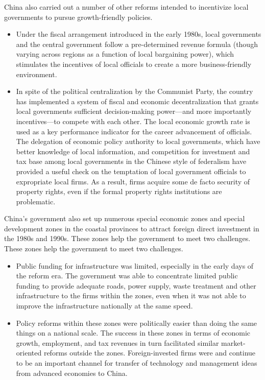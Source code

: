 \documentclass{article}
\begin{document}
    China also carried out a number of other reforms intended to incentivize local governments to pursue growth-friendly policies.
    \begin{itemize}
        \item Under the fiscal arrangement introduced in the early 1980s, local governments and the central government follow a pre-determined revenue formula (though varying across regions as a function of local bargaining power), which stimulates the incentives of local officials to create a more business-friendly environment.
        \item In spite of the political centralization by the Communist Party, the country has implemented a system of fiscal and economic decentralization that grants local governments sufficient decision-making power—and more importantly incentives—to compete with each other. The local economic growth rate is used as a key performance indicator for the career advancement of officials. The delegation of economic policy authority to local governments, which have better knowledge of local information, and competition for investment and tax base among local governments in the Chinese style of federalism have provided a useful check on the temptation of local government officials to expropriate local firms. As a result, firms acquire some de facto security of property rights, even if the formal property rights institutions are problematic.
    \end{itemize}

    China’s government also set up numerous special economic zones and special development zones in the coastal provinces to attract foreign direct investment in the 1980s and 1990s. These zones help the government to meet two challenges. These zones help the government to meet two challenges.
    \begin{itemize}
        \item Public funding for infrastructure was limited, especially in the early days of the reform era. The government was able to concentrate limited public funding to provide adequate roads, power supply, waste treatment and other infrastructure to the firms within the zones, even when it was not able to improve the infrastructure nationally at the same speed.
        \item Policy reforms within these zones were politically easier than doing the same things on a national scale. The success in these zones in terms of economic growth, employment, and tax revenues in turn facilitated similar market-oriented reforms outside the zones. Foreign-invested firms were and continue to be an important channel for transfer of technology and management ideas from advanced economies to China.
        
    \end{itemize}
\end{document}
